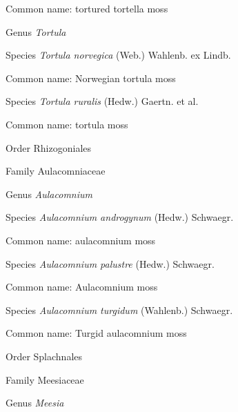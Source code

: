 \documentclass[9pt, article]{memoir}
\begin{document}
\begin{multicols}{2}
Common name: tortured tortella moss

\vspace{6pt}\noindent\hspace{30pt}Genus \textit{Tortula}


\vspace{6pt}\noindent\hspace{36pt}Species \textit{Tortula norvegica} (Web.) Wahlenb. ex Lindb.


Common name: Norwegian tortula moss

\vspace{6pt}\noindent\hspace{36pt}Species \textit{Tortula ruralis} (Hedw.) Gaertn. et al.


Common name: tortula moss

\vspace{6pt}\noindent\hspace{18pt}Order Rhizogoniales


\vspace{6pt}\noindent\hspace{24pt}Family Aulacomniaceae


\vspace{6pt}\noindent\hspace{30pt}Genus \textit{Aulacomnium}


\vspace{6pt}\noindent\hspace{36pt}Species \textit{Aulacomnium androgynum} (Hedw.) Schwaegr.


Common name: aulacomnium moss

\vspace{6pt}\noindent\hspace{36pt}Species \textit{Aulacomnium palustre} (Hedw.) Schwaegr.


Common name: Aulacomnium moss

\vspace{6pt}\noindent\hspace{36pt}Species \textit{Aulacomnium turgidum} (Wahlenb.) Schwaegr.


Common name: Turgid aulacomnium moss

\vspace{6pt}\noindent\hspace{18pt}Order Splachnales


\vspace{6pt}\noindent\hspace{24pt}Family Meesiaceae


\vspace{6pt}\noindent\hspace{30pt}Genus \textit{Meesia}



\end{multicols}
\end{document}
